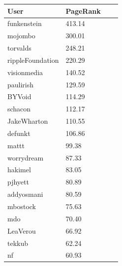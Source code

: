 \begin{table}[ht]
\centering
\small\renewcommand{\arraystretch}{1.4}  
%
\label{follow_pagerank_table}
%
\begin{tabularx}{0.4\textwidth}{lXXX}
\hline
\rowcolor{tableheadcolor}
User & PageRank \\
\hline
funkenstein& 413.14 \\
mojombo & 300.01 \\
torvalds & 248.21 \\
rippleFoundation & 220.29 \\
visionmedia & 140.52 \\
paulirish & 129.59 \\
BYVoid & 114.29 \\
schacon & 112.17 \\
JakeWharton & 110.55 \\
defunkt & 106.86 \\
mattt & 99.38 \\
worrydream & 87.33 \\
hakimel & 83.05 \\
pjhyett & 80.89 \\
addyosmani & 80.59 \\
mbostock & 75.63 \\
mdo & 70.40 \\
LeaVerou & 66.92 \\
tekkub & 62.24 \\
nf & 60.93 \\
\hline
\end{tabularx}
\end{table}




